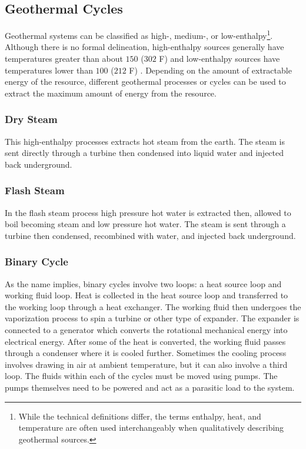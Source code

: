 \subsection{Geothermal Cycles}
Geothermal systems can be classified as high-, medium-, or low-enthalpy\footnote{While the technical definitions differ, the terms enthalpy, heat, and temperature are often used interchangeably when qualitatively describing geothermal sources.}. Although there is no formal delineation, high-enthalpy sources generally have temperatures greater than about $150$ \textcelsius{} ($302$ \textdegree{}F) and low-enthalpy sources have temperatures lower than $100$ \textcelsius{} ($212$ \textdegree{}F) \cite{Norden2011}. Depending on the amount of extractable energy of the resource, different geothermal processes or cycles can be used to extract the maximum amount of energy from the resource.

\subsubsection{Dry Steam}
This high-enthalpy processes extracts hot steam from the earth. The steam is sent directly through a turbine then condensed into liquid water and injected back underground. 

\subsubsection{Flash Steam} 
In the flash steam process high pressure hot water is extracted then, allowed to boil becoming steam and low pressure hot water. The steam is sent through a turbine then condensed, recombined with water, and injected back underground.

\subsubsection{Binary Cycle} 
As the name implies, binary cycles involve two loops: a heat source loop and working fluid loop. Heat is collected in the heat source loop and transferred to the working loop through a heat exchanger. The working fluid then undergoes the vaporization process to spin a turbine or other type of expander. The expander is connected to a generator which converts the rotational mechanical energy into electrical energy. After some of the heat is converted, the working fluid passes through a condenser where it is cooled further. Sometimes the cooling process involves drawing in air at ambient temperature, but it can also involve a third loop. The fluids within each of the cycles must be moved using pumps. The pumps themselves need to be powered and act as a parasitic load to the system.

